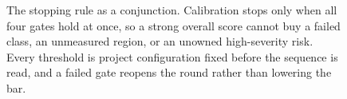 \begin{figure}[htbp]
\centering

\caption{The stopping rule as a conjunction. Calibration stops only when all four gates
  hold at once, so a strong overall score cannot buy a failed class, an unmeasured
  region, or an unowned high-severity risk. Every threshold is project configuration
  fixed before the sequence is read, and a failed gate reopens the round rather than
  lowering the bar.}
\label{eq:qd4-stop-gate}
\end{figure}

